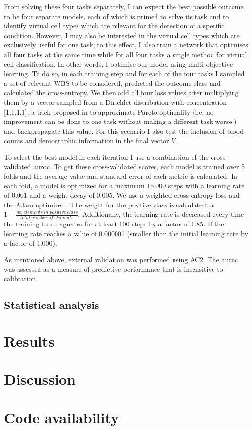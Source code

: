 From solving these four tasks separately, I can expect the best possible outcome to be four separate models, each of which is primed to solve its task and to identify virtual cell types which are relevant for the detection of a specific condition. However, I may also be interested in the virtual cell types which are exclusively useful for one task; to this effect, I also train a network that optimises all four tasks at the same time while for all four tasks a single method for virtual cell classification. In other words, I optimise our model using multi-objective learning. To do so, in each training step and for each of the four tasks I sampled a set of relevant WBS to be considered, predicted the outcome class and calculated the cross-entropy. We then add all four loss values after multiplying them by a vector sampled from a Dirichlet distribution with concentration [1,1,1,1], a trick proposed in \cite{Ruchte2021-ch} to approximate Pareto optimality (i.e. no improvement can be done to one task without making a different task worse \cite{Censor1977-nd}) and backpropagate this value. For this scenario I also test the inclusion of blood counts and demographic information in the final vector $V$.

To select the best model in each iteration I use a combination of the cross-validated \ac{auroc}. To get these cross-validated scores, each model is trained over 5 folds and the average value and standard error of each metric is calculated. In each fold, a model is optimized for a maximum 15,000 steps with a learning rate of 0.001 and a weight decay of 0.005. We use a weighted cross-entropy loss and the Adam optimizer \cite{Kingma2014-zd}. The weight for the positive class is calculated as $1 - \frac{no.\ elements\ in\ positive\ class}{total\ number\ of\ elements}$. Additionally, the learning rate is decreased every time the training loss stagnates for at least 100 steps by a factor of 0.85. If the learning rate reaches a value of 0.000001 (smaller than the initial learning rate by a factor of 1,000).

As mentioned above, external validation was performed using AC2. The \ac{auroc} was assessed as a measure of predictive performance that is insensitive to calibration. 

\subsection{Statistical analysis}

\section{Results}

\section{Discussion}

\section{Code availability}
